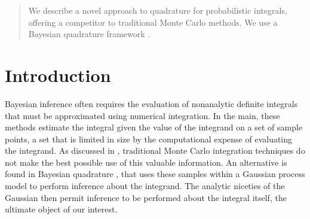 \documentclass{article}
\begin{document}
 


\begin{abstract} 
We describe a novel approach to quadrature for probabilistic integrals, offering a competitor to traditional Monte Carlo methods. We use a Bayesian quadrature framework \citep{BZHermiteQuadrature,BZMonteCarlo}.
\end{abstract} 

\section{Introduction}

Bayesian inference often requires the evaluation of nonanalytic
definite integrals that must be approximated using numerical
integration.  In the main, these methods estimate the integral given
the value of the integrand on a set of sample points, a set that is limited in size by the computational expense of evaluating the integrand.
As discussed in \citep{MCUnsound}, traditional Monte Carlo
integration techniques do not make the best possible use of this valuable information. An alternative is found in Bayesian quadrature \citep{BZHermiteQuadrature}, that uses these samples within a Gaussian process model to perform inference about the integrand. The analytic niceties of the Gaussian then permit inference to be performed about the integral itself, the ultimate object of our interest.
\end{document}
